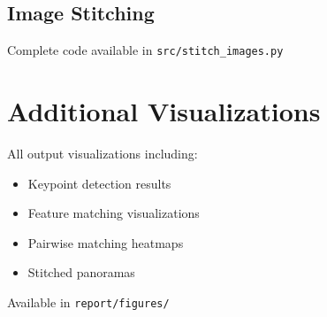 \documentclass[12pt,a4paper]{article}
\begin{document}
\subsection{Image Stitching}
Complete code available in \texttt{src/stitch\_images.py}

\section{Additional Visualizations}

All output visualizations including:
\begin{itemize}
    \item Keypoint detection results
    \item Feature matching visualizations
    \item Pairwise matching heatmaps
    \item Stitched panoramas
\end{itemize}

Available in \texttt{report/figures/}
\end{document}
